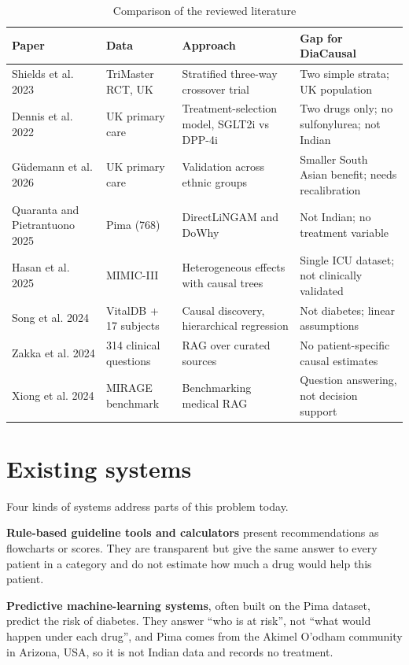 \begin{table}[H]\centering\small
\caption{Comparison of the reviewed literature}\label{tab:lit}
\begin{tabularx}{\textwidth}{p{2.9cm}p{2.3cm}YY}
\toprule
Paper & Data & Approach & Gap for DiaCausal\\\midrule
Shields et al. 2023 \cite{shields2023} & TriMaster RCT, UK & Stratified three-way crossover trial & Two simple strata; UK population\\
Dennis et al. 2022 \cite{dennis2022} & UK primary care & Treatment-selection model, SGLT2i vs DPP-4i & Two drugs only; no sulfonylurea; not Indian\\
G\"udemann et al. 2026 \cite{gudemann2025} & UK primary care & Validation across ethnic groups & Smaller South Asian benefit; needs recalibration\\
Quaranta and Pietrantuono 2025 \cite{quaranta2025} & Pima (768) & DirectLiNGAM and DoWhy & Not Indian; no treatment variable\\
Hasan et al. 2025 \cite{hasan2025} & MIMIC-III & Heterogeneous effects with causal trees & Single ICU dataset; not clinically validated\\
Song et al. 2024 \cite{song2024} & VitalDB + 17 subjects & Causal discovery, hierarchical regression & Not diabetes; linear assumptions\\
Zakka et al. 2024 \cite{zakka2024} & 314 clinical questions & RAG over curated sources & No patient-specific causal estimates\\
Xiong et al. 2024 \cite{xiong2024} & MIRAGE benchmark & Benchmarking medical RAG & Question answering, not decision support\\
\bottomrule\end{tabularx}\end{table}

\section{Existing systems}
Four kinds of systems address parts of this problem today.

\textbf{Rule-based guideline tools and calculators} present recommendations as flowcharts or scores. They are transparent but give the same answer to every patient in a category and do not estimate how much a drug would help this patient.

\textbf{Predictive machine-learning systems}, often built on the Pima dataset, predict the risk of diabetes. They answer ``who is at risk'', not ``what would happen under each drug'', and Pima comes from the Akimel O'odham community in Arizona, USA, so it is not Indian data and records no treatment.

